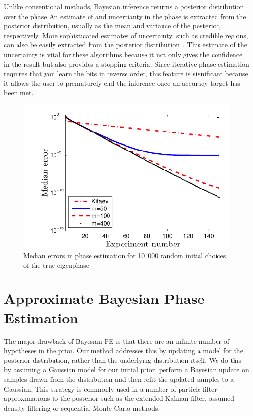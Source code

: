 \documentclass[aps,pra,amsmath,twocolumn,amssymb,superscriptaddress]{revtex4-1}
\begin{document}
Unlike conventional methods, Bayesian inference returns a posterior distribution over the
phase An estimate of and uncertianty in the phase is extracted from the
posterior distribution, usually as the mean and variance of the posterior,
respectively. More sophisticated estimates of uncertainty, such as credible
regions, can also be easily extracted from the posterior
distribution~\cite{granade_robust_2012}.  This estimate of the uncertainty is
vital for these algorithms because it not only gives the confidence in the
result but also provides a stopping criteria.  Since iterative phase
estimation requires that you learn the bits in reverse order, this feature is
significant because it allows the user to prematurely end the inference once
an accuracy target has been met.

\begin{figure}[t!]
    \begin{centering}
        \includegraphics[width=0.8\linewidth]{PEerror.pdf}
    \end{centering}
    \caption{\label{fig:PEerror}
     Median errors in phase estimation for 10~000 random initial choices of the true eigenphase.
    }
\end{figure}


\section{Approximate Bayesian Phase Estimation}
The major drawback of Bayesian PE is that there are an infinite number of hypotheses in the prior.  Our method addresses this by updating a model for the posterior distribution, rather than the underlying distribution itself.  We do this by assuming a Gaussian model for our initial prior, perform a Bayesian update on samples drawn from the distribution and then refit the updated samples to a Gaussian.  This strategy is commonly used in a number of particle filter approximations to the posterior such as the extended Kalman filter, assumed density filtering or sequential Monte Carlo methods.
\end{document}
